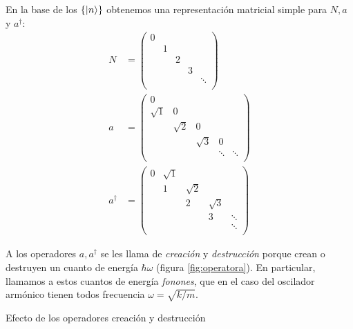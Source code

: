 En la base de los $\{\ket{n}\}$ obtenemos una representación matricial
simple para $N,a$ y $a^\dagger$:
\begin{align}
  N &= 
  \begin{pmatrix}
    0& & & & \\
     &1& & & \\
     & &2& & \\
     & & &3& \\
     & & & &\ddots\\
  \end{pmatrix} \tag{Operador número}\\
  a &= 
  \begin{pmatrix}
    0& & & & \\
     \sqrt{1}&0& & & \\
     & \sqrt{2}&0& & \\
     & & \sqrt{3}&0& \\
     & & & \ddots&\ddots\\
  \end{pmatrix} \tag{Operador aniquilación}\\
  a^\dagger &= 
  \begin{pmatrix}
    0&\sqrt{1}& & & \\
     &1&\sqrt{2}& & \\
     & &2&\sqrt{3}& \\
     & & &3&\ddots\\
     & & & & \ddots\\
  \end{pmatrix} \tag{Operador creación}
\end{align}

A los operadores $a,a^\dagger$ se les llama de \emph{creación} y
\emph{destrucción} porque crean o destruyen un cuanto de energía
$\hbar\omega$ (figura \ref{fig:operatora}). En particular, llamamos a
estos cuantos de energía \emph{fonones}, que en el caso del oscilador
armónico tienen todos frecuencia $\omega=\sqrt{k/m}$.
\begin{marginfigure}
  \centering
  \vspace{2cm}
  \caption{Efecto de los operadores creación y destrucción}
  \label{fig:operatora}
\end{marginfigure}


